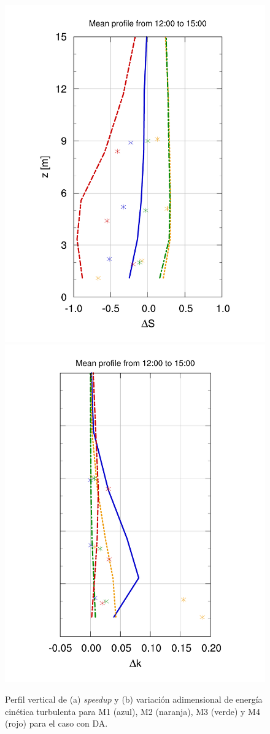 \begin{figure}[H]
	\centering
	\includegraphics[height=0.75\linewidth,page=1,trim={28mm 10mm 25mm 23mm},clip]{Imagenes/06/bol_da/V_masts}%
	\includegraphics[height=0.75\linewidth,page=1,trim={30mm 10mm 17mm 20mm},clip]{Imagenes/06/bol_da/k_masts}%
	\vspace{-2mm}\caption{Perfil vertical de (a) \emph{speedup} y (b) variación adimensional de energía cinética turbulenta para M1 (azul), M2 (naranja), M3 (verde) y M4 (rojo) para el caso con DA.}
	\label{fig:06_bol_da_mast_tke_speedup}
\end{figure}
\vspace*{\fill}
\newpage

